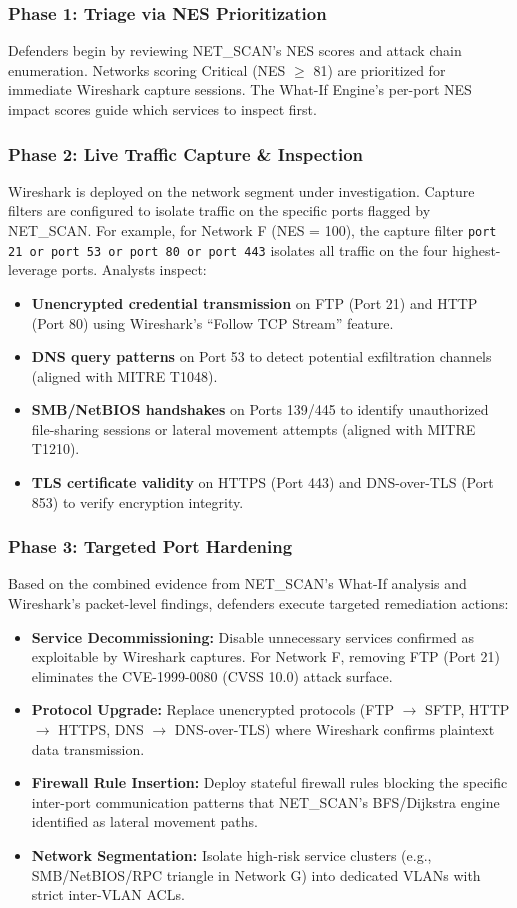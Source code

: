 \documentclass[conference]{IEEEtran}
\begin{document}
\subsubsection{Phase 1: Triage via NES Prioritization}
Defenders begin by reviewing NET\_SCAN's NES scores and attack chain enumeration. Networks scoring Critical (NES $\geq$ 81) are prioritized for immediate Wireshark capture sessions. The What-If Engine's per-port NES impact scores guide which services to inspect first.

\subsubsection{Phase 2: Live Traffic Capture \& Inspection}
Wireshark is deployed on the network segment under investigation. Capture filters are configured to isolate traffic on the specific ports flagged by NET\_SCAN. For example, for Network F (NES = 100), the capture filter \texttt{port 21 or port 53 or port 80 or port 443} isolates all traffic on the four highest-leverage ports. Analysts inspect:
\begin{itemize}
    \item \textbf{Unencrypted credential transmission} on FTP (Port 21) and HTTP (Port 80) using Wireshark's ``Follow TCP Stream'' feature.
    \item \textbf{DNS query patterns} on Port 53 to detect potential exfiltration channels (aligned with MITRE T1048).
    \item \textbf{SMB/NetBIOS handshakes} on Ports 139/445 to identify unauthorized file-sharing sessions or lateral movement attempts (aligned with MITRE T1210).
    \item \textbf{TLS certificate validity} on HTTPS (Port 443) and DNS-over-TLS (Port 853) to verify encryption integrity.
\end{itemize}

\subsubsection{Phase 3: Targeted Port Hardening}
Based on the combined evidence from NET\_SCAN's What-If analysis and Wireshark's packet-level findings, defenders execute targeted remediation actions:
\begin{itemize}
    \item \textbf{Service Decommissioning:} Disable unnecessary services confirmed as exploitable by Wireshark captures. For Network F, removing FTP (Port 21) eliminates the CVE-1999-0080 (CVSS 10.0) attack surface.
    \item \textbf{Protocol Upgrade:} Replace unencrypted protocols (FTP $\to$ SFTP, HTTP $\to$ HTTPS, DNS $\to$ DNS-over-TLS) where Wireshark confirms plaintext data transmission.
    \item \textbf{Firewall Rule Insertion:} Deploy stateful firewall rules blocking the specific inter-port communication patterns that NET\_SCAN's BFS/Dijkstra engine identified as lateral movement paths.
    \item \textbf{Network Segmentation:} Isolate high-risk service clusters (e.g., SMB/NetBIOS/RPC triangle in Network G) into dedicated VLANs with strict inter-VLAN ACLs.
\end{itemize}
\end{document}
